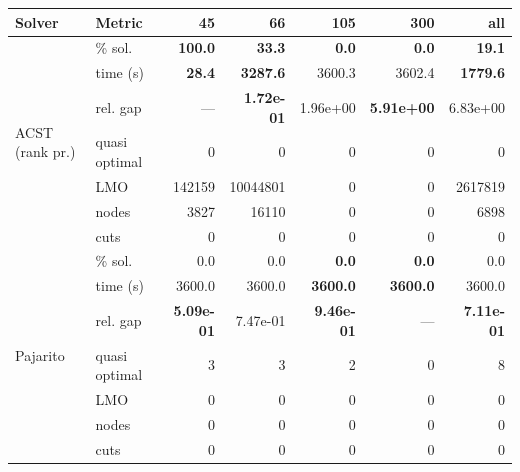 \begin{tabular}{llrrrrr}
\toprule
 Solver & Metric & 45 & 66 & 105 & 300 & all \\
\midrule
\multirow{7}{*}{ACST (rank pr.)} & \% sol. & \textbf{100.0} & \textbf{33.3} & \textbf{0.0} & \textbf{0.0} & \textbf{19.1} \\
  & time (s) & \textbf{28.4} & \textbf{3287.6} & 3600.3 & 3602.4 & \textbf{1779.6} \\
  & rel. gap & --- & \textbf{1.72e-01} & 1.96e+00 & \textbf{5.91e+00} & 6.83e+00 \\
  & quasi optimal & 0 & 0 & 0 & 0 & 0 \\
  & LMO & 142159 & 10044801 & 0 & 0 & 2617819 \\
  & nodes & 3827 & 16110 & 0 & 0 & 6898 \\
  & cuts & 0 & 0 & 0 & 0 & 0 \\
\midrule
\multirow{7}{*}{Pajarito} & \% sol. & 0.0 & 0.0 & \textbf{0.0} & \textbf{0.0} & 0.0 \\
  & time (s) & 3600.0 & 3600.0 & \textbf{3600.0} & \textbf{3600.0} & 3600.0 \\
  & rel. gap & \textbf{5.09e-01} & 7.47e-01 & \textbf{9.46e-01} & --- & \textbf{7.11e-01} \\
  & quasi optimal & 3 & 3 & 2 & 0 & 8 \\
  & LMO & 0 & 0 & 0 & 0 & 0 \\
  & nodes & 0 & 0 & 0 & 0 & 0 \\
  & cuts & 0 & 0 & 0 & 0 & 0 \\
\bottomrule
\end{tabular}
